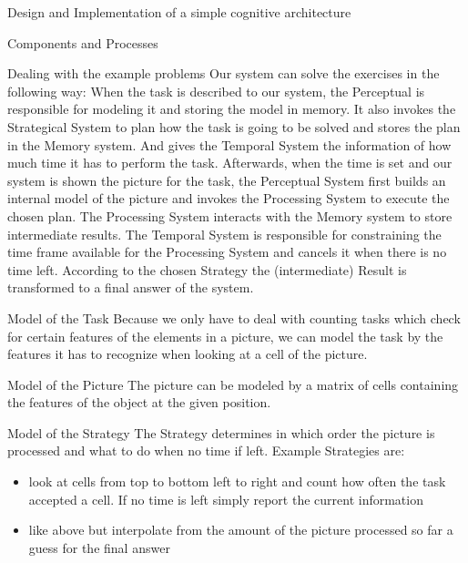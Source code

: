 \documentclass[presentation]{beamer}
\begin{document}
\begin{frame}[label=sec-1]{Design and Implementation of a simple cognitive architecture}
\begin{block}{Components and Processes}
\begin{itemize}
\end{itemize}
\end{block}
\begin{block}{Dealing with the example problems}
Our system can solve the exercises in the following way:
When the task is described to our system, the Perceptual is
responsible for modeling it and storing the model in memory.
It also invokes the Strategical System to plan how the task is
going to be solved and stores the plan in the Memory system.
And gives the Temporal System the information of how much time it
has to perform the task.
Afterwards, when the time is set and our system is shown the
picture for the task, the Perceptual System first builds an
internal model of the picture and invokes the Processing System to
execute the chosen plan. The Processing System interacts with the
Memory system to store intermediate results.
The Temporal System is responsible for constraining the time frame
available for the Processing System and cancels it when there is no
time left. According to the chosen Strategy the (intermediate)
Result is transformed to a final answer of the system.

\begin{block}{Model of the Task}
Because we only have to deal with counting tasks which check for
certain features of the elements in a picture, we can model the
task by the features it has to recognize when looking at a cell of
the picture.
\end{block}

\begin{block}{Model of the Picture}
The picture can be modeled by a matrix of cells containing the
features of the object at the given position.
\end{block}

\begin{block}{Model of the Strategy}
The Strategy determines in which order the picture is processed
and what to do when no time if left.
Example Strategies are:
\begin{itemize}
\item look at cells from top to bottom left to right and count how
often the task accepted a cell. If no time is left simply report
the current information
\item like above but interpolate from the amount of the picture
processed so far a guess for the final answer
\end{itemize}
\end{block}
\end{block}
\end{frame}
\end{document}
